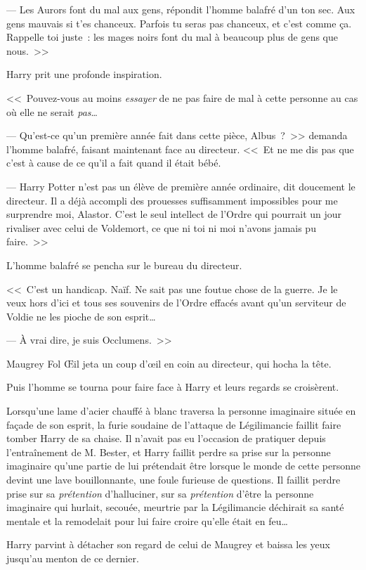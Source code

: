 --- Les Aurors font du mal aux gens, répondit l'homme balafré d'un ton sec. Aux gens mauvais si t'es chanceux. Parfois tu seras pas chanceux, et c'est comme ça. Rappelle toi juste~: les mages noirs font du mal à beaucoup plus de gens que nous.~>>

Harry prit une profonde inspiration.

<<~Pouvez-vous au moins \emph{essayer} de ne pas faire de mal à cette personne au cas où elle ne serait \emph{pas}…

--- Qu'est-ce qu'un première année fait dans cette pièce, Albus~?~>> demanda l'homme balafré, faisant maintenant face au directeur. <<~Et ne me dis pas que c'est à cause de ce qu'il a fait quand il était bébé.

--- Harry Potter n'est pas un élève de première année ordinaire, dit doucement le directeur. Il a déjà accompli des prouesses suffisamment impossibles pour me surprendre moi, Alastor. C'est le seul intellect de l'Ordre qui pourrait un jour rivaliser avec celui de Voldemort, ce que ni toi ni moi n'avons jamais pu faire.~>>

L'homme balafré se pencha sur le bureau du directeur.

<<~C'est un handicap. Naïf. Ne sait pas une foutue chose de la guerre. Je le veux hors d'ici et tous ses souvenirs de l'Ordre effacés avant qu'un serviteur de Voldie ne les pioche de son esprit…

--- À vrai dire, je suis Occlumens.~>>

Maugrey Fol Œil jeta un coup d'œil en coin au directeur, qui hocha la tête.

Puis l'homme se tourna pour faire face à Harry et leurs regards se croisèrent.

Lorsqu'une lame d'acier chauffé à blanc traversa la personne imaginaire située en façade de son esprit, la furie soudaine de l'attaque de Légilimancie faillit faire tomber Harry de sa chaise. Il n'avait pas eu l'occasion de pratiquer depuis l'entraînement de M. Bester, et Harry faillit perdre sa prise sur la personne imaginaire qu'une partie de lui prétendait être lorsque le monde de cette personne devint une lave bouillonnante, une foule furieuse de questions. Il faillit perdre prise sur sa \emph{prétention} d'halluciner, sur sa \emph{prétention} d'être la personne imaginaire qui hurlait, secouée, meurtrie par la Légilimancie déchirait sa santé mentale et la remodelait pour lui faire croire qu'elle était en feu…

Harry parvint à détacher son regard de celui de Maugrey et baissa les yeux jusqu'au menton de ce dernier.

